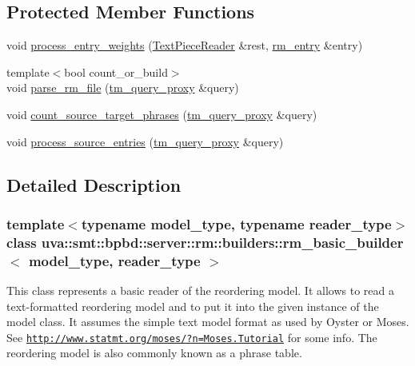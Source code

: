 \subsection*{Protected Member Functions}
\begin{DoxyCompactItemize}
\item 
void \hyperlink{classuva_1_1smt_1_1bpbd_1_1server_1_1rm_1_1builders_1_1rm__basic__builder_a4a9b39452bee7c7579fcf7e2ee9a026f}{process\+\_\+entry\+\_\+weights} (\hyperlink{classuva_1_1utils_1_1file_1_1_text_piece_reader}{Text\+Piece\+Reader} \&rest, \hyperlink{namespaceuva_1_1smt_1_1bpbd_1_1server_1_1rm_1_1models_a67353bb21590b2a2adf05500899439ed}{rm\+\_\+entry} \&entry)
\item 
{\footnotesize template$<$bool count\+\_\+or\+\_\+build$>$ }\\void \hyperlink{classuva_1_1smt_1_1bpbd_1_1server_1_1rm_1_1builders_1_1rm__basic__builder_a3e60b55d0c927ae6a777642ea726b435}{parse\+\_\+rm\+\_\+file} (\hyperlink{classuva_1_1smt_1_1bpbd_1_1server_1_1tm_1_1proxy_1_1tm__query__proxy}{tm\+\_\+query\+\_\+proxy} \&query)
\item 
void \hyperlink{classuva_1_1smt_1_1bpbd_1_1server_1_1rm_1_1builders_1_1rm__basic__builder_a6712388503beebcac2f202470ca6c77d}{count\+\_\+source\+\_\+target\+\_\+phrases} (\hyperlink{classuva_1_1smt_1_1bpbd_1_1server_1_1tm_1_1proxy_1_1tm__query__proxy}{tm\+\_\+query\+\_\+proxy} \&query)
\item 
void \hyperlink{classuva_1_1smt_1_1bpbd_1_1server_1_1rm_1_1builders_1_1rm__basic__builder_a038e003cf4641e6f0a90a708176cf0d9}{process\+\_\+source\+\_\+entries} (\hyperlink{classuva_1_1smt_1_1bpbd_1_1server_1_1tm_1_1proxy_1_1tm__query__proxy}{tm\+\_\+query\+\_\+proxy} \&query)
\end{DoxyCompactItemize}


\subsection{Detailed Description}
\subsubsection*{template$<$typename model\+\_\+type, typename reader\+\_\+type$>$class uva\+::smt\+::bpbd\+::server\+::rm\+::builders\+::rm\+\_\+basic\+\_\+builder$<$ model\+\_\+type, reader\+\_\+type $>$}

This class represents a basic reader of the reordering model. It allows to read a text-\/formatted reordering model and to put it into the given instance of the model class. It assumes the simple text model format as used by Oyster or Moses. See \href{http://www.statmt.org/moses/?n=Moses.Tutorial}{\tt http\+://www.\+statmt.\+org/moses/?n=\+Moses.\+Tutorial} for some info. The reordering model is also commonly known as a phrase table. 

